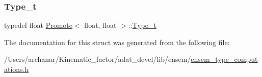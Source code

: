 \subsubsection{\texorpdfstring{Type\_t}{Type\_t}\hspace{0.1cm}{\footnotesize\ttfamily [2/2]}}
{\footnotesize\ttfamily typedef float \mbox{\hyperlink{structPromote}{Promote}}$<$ float, float $>$\+::\mbox{\hyperlink{structPromote_3_01float_00_01float_01_4_a7a0db669ca1c2569d700f8e431371d30}{Type\+\_\+t}}}



The documentation for this struct was generated from the following file\+:\begin{DoxyCompactItemize}
\item 
/\+Users/archanar/\+Kinematic\+\_\+factor/adat\+\_\+devel/lib/ensem/\mbox{\hyperlink{lib_2ensem_2ensem__type__computations_8h}{ensem\+\_\+type\+\_\+computations.\+h}}\end{DoxyCompactItemize}

